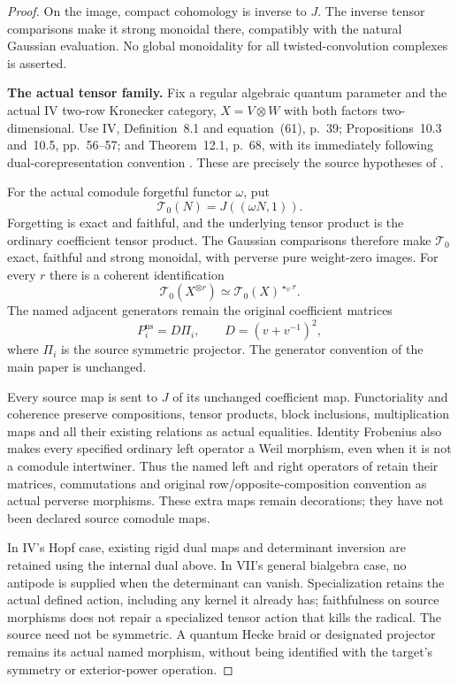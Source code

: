 \begin{proof}
On the image, compact cohomology is inverse to $J$.
The inverse tensor comparisons make it strong monoidal
there, compatibly with the natural Gaussian evaluation.
No global monoidality for all twisted-convolution
complexes is asserted.

\par\smallskip\noindent\textbf{The actual tensor family.}\quad
Fix a regular algebraic quantum parameter and the actual
IV two-row Kronecker category, $X=V\otimes W$ with both
factors two-dimensional.
Use IV, Definition~8.1 and equation~(61), p.~39;
Propositions~10.3 and~10.5, pp.~56--57; and
Theorem~12.1, p.~68, with its immediately following
dual-corepresentation convention \cite{IV}.
These are precisely the source hypotheses of .

For the actual comodule forgetful functor $\omega$, put
\[
 \mathcal T_0(N)=J((\omega N,1)).
\]
Forgetting is exact and faithful, and the underlying
tensor product is the ordinary coefficient tensor
product. The Gaussian comparisons therefore make
$\mathcal T_0$ exact, faithful and strong monoidal,
with perverse pure weight-zero images.
For every $r$ there is a coherent identification
\[
 \mathcal T_0(X^{\otimes r})
       \simeq\mathcal T_0(X)^{\star_\psi r}.
\]
The named adjacent generators remain the original
coefficient matrices
\[
 P_i^{\mathrm{ns}}=D\Pi_i,\qquad
 D=(v+v^{-1})^2,
\]
where $\Pi_i$ is the source symmetric projector.
The generator convention of the main paper is unchanged.

Every source map is sent to $J$ of its unchanged
coefficient map. Functoriality and coherence preserve
compositions, tensor products, block inclusions,
multiplication maps and all their existing relations
as actual equalities.
Identity Frobenius also makes every specified ordinary
left operator a Weil morphism, even when it is not
a comodule intertwiner.
Thus the named left and right operators of 
retain their matrices, commutations and original
row/opposite-composition convention as actual perverse
morphisms. These extra maps remain decorations;
they have not been declared source comodule maps.

In IV's Hopf case, existing rigid dual maps and
determinant inversion are retained using the internal
dual above. In VII's general bialgebra case, no antipode
is supplied when the determinant can vanish.
Specialization retains the actual defined action,
including any kernel it already has; faithfulness
on source morphisms does not repair a specialized
tensor action that kills the radical.
The source need not be symmetric.
A quantum Hecke braid or designated projector remains
its actual named morphism, without being identified
with the target's symmetry or exterior-power operation.


\end{proof}
